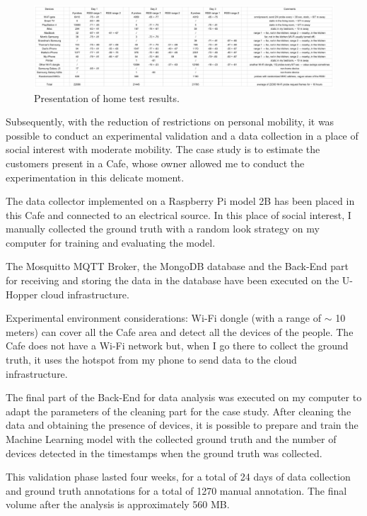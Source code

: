 \begin{figure}[h]
\centering 
\includegraphics[width=1\textwidth]{images/sniffertest} 
\caption{Presentation of home test results.}
\label{fig:sniffertest}
\end{figure}

Subsequently, with the reduction of restrictions on personal mobility, it was possible to conduct an experimental validation and a data collection in a place of social interest with moderate mobility. The case study is to estimate the customers present in a Cafe, whose owner allowed me to conduct the experimentation in this delicate moment.

The data collector implemented on a Raspberry Pi model 2B has been placed in this Cafe and connected to an electrical source. In this place of social interest, I manually collected the ground truth with a random look strategy on my computer for training and evaluating the model.

The Mosquitto MQTT Broker, the MongoDB database and the Back-End part for receiving and storing the data in the database have been executed on the U-Hopper cloud infrastructure.

Experimental environment considerations: Wi-Fi dongle (with a range of $\sim$ 10 meters) can cover all the Cafe area and detect all the devices of the people. The Cafe does not have a Wi-Fi network but, when I go there to collect the ground truth, it uses the hotspot from my phone to send data to the cloud infrastructure.

The final part of the Back-End for data analysis was executed on my computer to adapt the parameters of the cleaning part for the case study. After cleaning the data and obtaining the presence of devices, it is possible to prepare and train the Machine Learning model with the collected ground truth and the number of devices detected in the timestamps when the ground truth was collected.


This validation phase lasted four weeks, for a total of 24 days of data collection and ground truth annotations for a total of 1270 manual annotation. The final volume after the analysis is approximately 560 MB.


